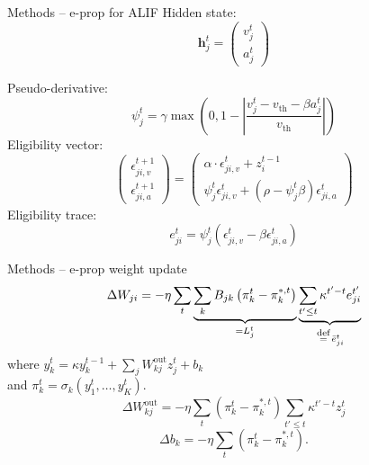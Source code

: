 \documentclass[t]{beamer}
\newcommand\eqdef{\ \mathrel{\overset{\makebox[0pt]{\mbox{\normalfont\scriptsize\rmfamily def}}}{=}}\ }
\begin{document}
\begin{frame}{Methods -- e-prop for ALIF}
  Hidden state:
  \begin{equation}
  \mathbf{h}^t_j = \begin{pmatrix}
  v^t_j\\
  a^t_j
  \end{pmatrix}
  \end{equation}

  Pseudo-derivative:
  \begin{equation}
  \psi_j^t = \gamma \max\left(0, 1 - \left|\frac{v_j^t - v_\text{th} - \beta a^t_j}{v_\text{th}}\right|\right)
  \end{equation}
  Eligibility vector:
  \begin{equation}
  \begin{pmatrix}
              \epsilon_{ji, v}^{t+1}\\
              \epsilon_{ji, a}^{t+1}
              \end{pmatrix} = \begin{pmatrix}
              \alpha \cdot\epsilon_{ji, v}^t + z_i^{t-1}\\
              \psi^t_j\epsilon^t_{ji, v} + \left(\rho-\psi^t_j\beta\right)\epsilon^t_{ji, a}
              \end{pmatrix}
  \end{equation}
  Eligibility trace:
  \begin{equation}
  e^t_{ji} = \psi^t_j\left(\epsilon_{ji, v}^t - \beta\epsilon_{ji, a}^t\right)
  \end{equation}
\end{frame}

\begin{frame}{Methods -- e-prop weight update}
  \begin{equation}
    \Delta W_{ji} = -\eta\sum_t\underbrace{\sum_kB_{jk}\left(\pi^{t}_k - \pi^{*,t}_k\right)}_{=L^t_j}\underbrace{\sum_{t'\leq t}\kappa^{t'-t}e^{t'}_{ji}}_{\eqdef \bar{e}^t_{ji}}
    \end{equation}
    where $y^t_k = \kappa y^{t-1}_k + \sum_j W^\text{out}_{kj}z^t_j+b_k$\\
    and $\pi^t_k = \sigma_k\left(y^t_1,\ldots,y^t_K\right)$.
    \begin{equation}
    \Delta W^\text{out}_{kj} = -\eta \sum_t\left(\pi^t_k - \pi^{*,t}_k\right)\sum_{t'\leq t}\kappa^{t'-t}z^t_j
    \end{equation}
    \begin{equation}
    \Delta b_k = -\eta \sum_t\left(\pi^t_k - \pi^{*,t}_k\right).
    \end{equation}
\end{frame}
\end{document}
